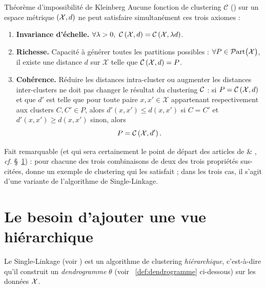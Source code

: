 \begin{Resultat}{Théorème d'impossibilité de  \cite{Kleinberg2002}}{Kleinberg}
Aucune fonction de clustering $ \mathcal C$ () sur un espace métrique $(\mathcal{X}, d)$ ne peut satisfaire simultanément ces trois axiomes : 
\begin{enumerate}[label=(\roman*)]
    \item \textbf{Invariance d'échelle.}  $\forall \lambda > 0, \ \mathcal{C} \left(\mathcal{X}, d \right) = \mathcal{C} \left(\mathcal{X},  \lambda d \right)$.
    \item \textbf{Richesse.} Capacité à générer toutes les partitions possibles : $\forall P \in \mathcal{P}\mathrm{art}\bigl( \mathcal X \bigr)$, il existe une distance $d$ sur $\mathcal X $ telle que $\mathcal{C} \left(\mathcal{X}, d \right) = P$.
    \item \textbf{Cohérence.} Réduire les distances intra-cluster ou augmenter les distances inter-clusters ne doit pas changer le résultat du clustering $\mathcal{C}$ : si $P = \mathcal{C} \left(\mathcal{X}, d \right)$ et que $d'$ est telle que pour toute paire $x,x'\in \mathcal X$ appartenant respectivement aux clusters $C,C' \in P$, alors $d'(x,x') \le d(x,x')$ si $C =C'$ et $d'(x,x') \ge d(x,x')$ sinon, alors \[P = \mathcal{C} \left(\mathcal{X}, d' \right).\]
\end{enumerate}
\end{Resultat}



Fait remarquable (et qui sera certainement le point de départ des articles de  \& , \emph{cf.} \S~\ref{sec:clusteringHierarchique}) : pour chacune des trois combinaisons de deux des trois propriétés sus-citées,  donne un exemple de clustering qui les satisfait ; dans les trois cas, il s'agit d'une variante de l'algorithme de {Single-Linkage}.


\section{Le besoin d'ajouter une vue hiérarchique}\label{sec:clusteringHierarchique}

Le Single-Linkage (voir ) est un algorithme de clustering \emph{hiérarchique}, c'est-à-dire qu'il construit un \emph{dendrogramme} $\theta$ (voir \Def~\ref{def:dendrogramme} ci-dessous) sur les données $\mathcal{X}$. %



